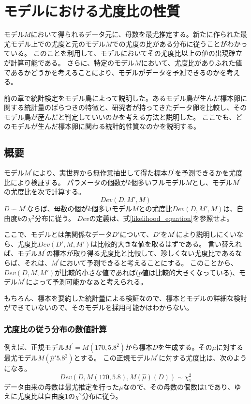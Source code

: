 \chapter{モデルにおける尤度比の性質}
モデル$M$において得られるデータ元に、母数を最尤推定する。新たに作られた最尤モデル上での尤度と元のモデル$M$での尤度の比がある分布に従うことがわかっている。
このことを利用して、モデルにおいてその尤度比以上の値の出現確立が計算可能である。
さらに、特定のモデル$M$において、尤度比がありふれた値であるかどうかを考えることにより、モデルがデータを予測できるのかを考える。

前の章で統計検定をモデル鳥によって説明した。あるモデル鳥が生んだ標本卵に関する統計量のばらつきの特徴と、研究者が持ってきたデータ卵を比較し、そのモデル鳥が産んだと判定していいのかを考える方法と説明した。
ここでも、どのモデルが生んだ標本卵に関わる統計的性質なのかを説明する。



\section{概要}

モデル$M^{'}$により、実世界から無作意抽出して得た標本$D^{'}$を予測できるかを尤度比により検証する。
パラメータの個数が$k$個多いフルモデル$M$とし、モデル$M^{'}$の尤度比を次で計算する。
\begin{equation*}
    Dev(D,M',M)
\end{equation*}
$D\sim M^{'}$ならば、母数の個が$k$個多いモデル$M$との尤度比$Dev(D,M',M)$は、自由度$k$の$\chi^2$分布に従う。
$Dev$の定義は、式\ref{likelihood_equation}を参照せよ。

ここで、モデルとは無関係なデータ$D'$について、$D'$を$M^{'}$により説明しにくいなら、尤度比$Dev(D',M,M')$は比較的大きな値を取るはずである。
言い替えれば、モデル$M^{'}$の標本が取り得る尤度比と比較して、珍しくない尤度比であるならば、それは、$M^{'}$において予測できると考えることにする。
このことから、$Dev(D,M,M')$が比較的小さな値であれば($p$値は比較的大きくなっている)、モデル$M^{'}$によって予測可能かなぁと考えられる。

もちろん、標本を要約した統計量による検証なので、標本とモデルの詳細な検討ができていないので、そのモデルを採用可能かはわからない。

\subsection{尤度比の従う分布の数値計算}
例えば、正規モデル$M^{'}=M(170,5.8^2)$から標本$D$を生成する。その$\mu$に対する最尤モデル$M(\hat{\mu}\prime5.8^2)$とする。
この正規モデル$M^{'}$に対する尤度比は、次のようになる。
\begin{equation*}
    Dev(D,M(170,5.8),M(\hat{\mu})(D)) \sim \chi^2_1
\end{equation*}
データ由来の母数は最尤推定を行った$\mu$なので、その母数の個数は$1$であり、ゆえに尤度比は自由度$1$の$\chi^2$分布に従う。


